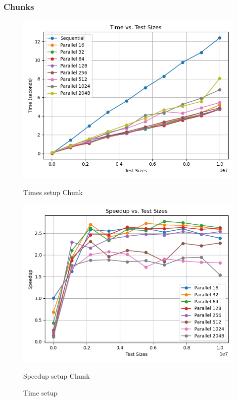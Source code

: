 \documentclass[11pt]{article}
\begin{document}
    \subsubsection{Chunks}\label{subsubsec:010-chunks}
    \begin{figure}[H]
        \centering
        \includegraphics[width=\linewidth]{joblib/010/chunks_time_plot}
            \caption{Times setup Chunk}\label{fig:010-chunks_time}
        \endminipage\hfill
        \includegraphics[width=\linewidth]{joblib/010/chunks_speedup_plot}
            \caption{Speedup setup Chunk}\label{fig:010-chunks_speedup}
        \endminipage\hfill
        \caption{Time setup}
    \end{figure}
\end{document}
